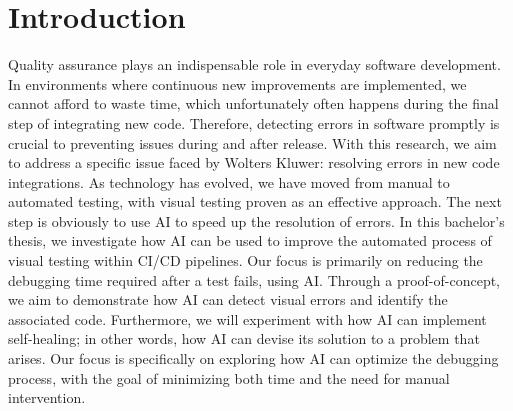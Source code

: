 


% 

\section{Introduction}%
\label{sec:Introduction}
Quality assurance plays an indispensable role in everyday software development. In environments where continuous new improvements are implemented, we cannot afford to waste time, which unfortunately often happens during the final step of integrating new code. Therefore, detecting errors in software promptly is crucial to preventing issues during and after release.
With this research, we aim to address a specific issue faced by Wolters Kluwer: resolving errors in new code integrations. As technology has evolved, we have moved from manual to automated testing, with visual testing proven as an effective approach. The next step is obviously to use AI to speed up the resolution of errors. 
In this bachelor’s thesis, we investigate how AI can be used to improve the automated process of visual testing within CI/CD pipelines. Our focus is primarily on reducing the debugging time required after a test fails, using AI. Through a proof-of-concept, we aim to demonstrate how AI can detect visual errors and identify the associated code.
Furthermore, we will experiment with how AI can implement self-healing; in other words, how AI can devise its solution to a problem that arises. Our focus is specifically on exploring how AI can optimize the debugging process, with the goal of minimizing both time and the need for manual intervention.


